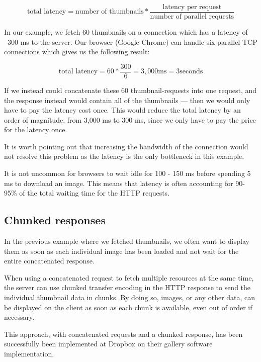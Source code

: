 \documentclass{cslthse-msc}
\begin{document}
\begin{equation}
\mbox{total latency} = \mbox{number of thumbnails} * \frac{\mbox{latency per request}}{\mbox{number of parallel requests}}
\end{equation}

In our example, we fetch 60 thumbnails on a connection which has a latency of ~300 ms to the server. Our browser (Google Chrome) can handle six parallel TCP connections which gives us the following result:

\begin{equation}
\mbox{total latency} = 60 * \frac{300}{6} = 3,000 \mbox{ms} = 3 \mbox{seconds}
\end{equation}

If we instead could concatenate these 60 thumbnail-requests into one request, and the response instead would contain all of the thumbnails --- then we would only have to pay the latency cost once. This would reduce the total latency by an order of magnitude, from 3,000 ms to 300 ms, since we only have to pay the price for the latency once.

It is worth pointing out that increasing the bandwidth of the connection would not resolve this problem as the latency is the only bottleneck in this example.

It is not uncommon for browsers to wait idle for 100 - 150 ms before spending 5 ms to download an image. This means that latency is often accounting for 90-95\% of the total waiting time for the HTTP requests\cite{latency}.

\subsection{Chunked responses}
In the previous example where we fetched thumbnails, we often want to display them as soon as each individual image has been loaded and not wait for the entire concatenated response. 

When using a concatenated request to fetch multiple resources at the same time, the server can use chunked transfer encoding in the HTTP response to send the individual thumbnail data in chunks\cite{chunked}. By doing so, images, or any other data, can be displayed on the client as soon as each chunk is available, even out of order if necessary. 

This approach, with concatenated requests and a chunked response, has been successfully been implemented at Dropbox on their gallery software implementation\cite{dropbox_chunked}.
\end{document}
